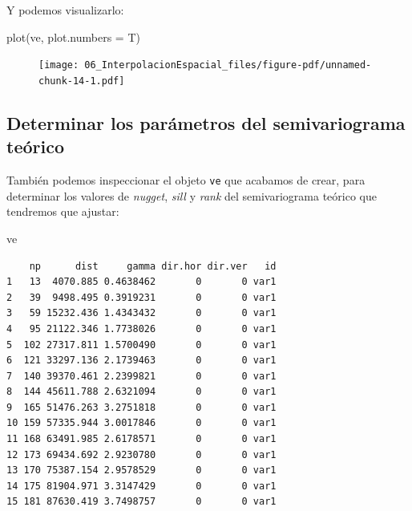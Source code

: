 \documentclass[
  letterpaper,
  DIV=11,
  numbers=noendperiod]{scrreprt}
\newenvironment{Shaded}{\begin{snugshade}}{\end{snugshade}}
\newcommand{\AttributeTok}[1]{\textcolor[rgb]{0.40,0.45,0.13}{#1}}
\newcommand{\FunctionTok}[1]{\textcolor[rgb]{0.28,0.35,0.67}{#1}}
\newcommand{\NormalTok}[1]{\textcolor[rgb]{0.00,0.23,0.31}{#1}}
\begin{document}
Y podemos visualizarlo:

\begin{Shaded}
\begin{Highlighting}[]
\FunctionTok{plot}\NormalTok{(ve, }\AttributeTok{plot.numbers =}\NormalTok{ T)}
\end{Highlighting}
\end{Shaded}

\begin{figure}[H]

{\centering \texttt{[image: 06\_InterpolacionEspacial\_files/figure-pdf/unnamed-chunk-14-1.pdf]}

}

\end{figure}

\hypertarget{determinar-los-paruxe1metros-del-semivariograma-teuxf3rico}{%
\subsection{Determinar los parámetros del semivariograma
teórico}\label{determinar-los-paruxe1metros-del-semivariograma-teuxf3rico}}

También podemos inspeccionar el objeto \texttt{ve} que acabamos de
crear, para determinar los valores de \emph{nugget}, \emph{sill} y
\emph{rank} del semivariograma teórico que tendremos que ajustar:

\begin{Shaded}
\begin{Highlighting}[]
\NormalTok{ve}
\end{Highlighting}
\end{Shaded}

\begin{verbatim}
    np      dist     gamma dir.hor dir.ver   id
1   13  4070.885 0.4638462       0       0 var1
2   39  9498.495 0.3919231       0       0 var1
3   59 15232.436 1.4343432       0       0 var1
4   95 21122.346 1.7738026       0       0 var1
5  102 27317.811 1.5700490       0       0 var1
6  121 33297.136 2.1739463       0       0 var1
7  140 39370.461 2.2399821       0       0 var1
8  144 45611.788 2.6321094       0       0 var1
9  165 51476.263 3.2751818       0       0 var1
10 159 57335.944 3.0017846       0       0 var1
11 168 63491.985 2.6178571       0       0 var1
12 173 69434.692 2.9230780       0       0 var1
13 170 75387.154 2.9578529       0       0 var1
14 175 81904.971 3.3147429       0       0 var1
15 181 87630.419 3.7498757       0       0 var1
\end{verbatim}
\end{document}

